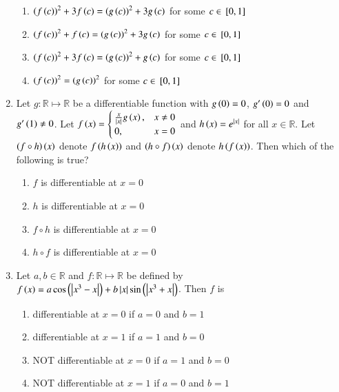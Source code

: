\documentclass[journal]{IEEEtran}
\numberwithin{equation}{enumi}
\numberwithin{figure}{enumi}
\begin{document}
\begin{enumerate}
    \hfill{}
    
    \begin{enumerate}
        \item ${\left(f\left(c\right)\right)}^2+3f\left(c\right)={\left(g\left(c\right)\right)}^2+3g\left(c\right)$ for some $c\in {}\left[0,1\right]$
        \item ${\left(f\left(c\right)\right)}^2+f\left(c\right)={\left(g\left(c\right)\right)}^2+3g\left(c\right)$ for some $c\in {}\left[0,1\right]$
        \item ${\left(f\left(c\right)\right)}^2+3f\left(c\right)={\left(g\left(c\right)\right)}^2+g\left(c\right)$ for some $c\in {}\left[0,1\right]$
        \item ${\left(f\left(c\right)\right)}^2={\left(g\left(c\right)\right)}^2$ for some $c\in {}\left[0,1\right]$ 
    \end{enumerate}


    \item 
	    Let $g: \mathbb{R}\mapsto \mathbb{R}$ be a differentiable function with $g\left(0\right)=0$, $g^{\prime}\left(0\right)=0$ and $g^{\prime}\left(1\right)\neq 0$. Let $f\left(x\right)=
        \begin{cases}
		\frac{x}{\left\vert x\right\vert}g\left(x\right), & x\neq 0 \\
            0, & x=0
        \end{cases}$ 
	and $h\left(x\right)=e^{\left\vert x\right\vert}$ for all $x\in \mathbb{R}$. Let $\left(f\circ h\right)\left(x\right)$ denote $f\left(h\left(x\right)\right)$ and $\left(h\circ f\right)\left(x\right)$ denote $h\left(f\left(x\right)\right)$. Then which of the following is true? 

    \hfill{}
    
    \begin{enumerate}        
        \item $f$ is differentiable at $x=0$ 
        \item $h$ is differentiable at $x=0$ 
        \item $f\circ h$ is differentiable at $x=0$ 
        \item $h\circ f$ is differentiable at $x=0$  
    \end{enumerate}


    \item 
	    Let $a, b\in \mathbb{R}$ and $f: \mathbb{R}\mapsto \mathbb{R}$ be defined by $f\left(x\right)=a\cos \left(\left\vert x^3-x\right\vert\right) +b\left\vert x\right\vert\sin \left(\left\vert x^3+x\right\vert\right)$. Then $f$ is 
   
    \hfill{}
    
    \begin{enumerate}
        \item differentiable at $x=0$ if $a=0$ and $b=1$
        \item differentiable at $x=1$ if $a=1$ and $b=0$
        \item {NOT} differentiable at $x=0$ if $a=1$ and $b=0$
        \item {NOT} differentiable at $x=1$ if $a=0$ and $b=1$
    \end{enumerate}



\end{enumerate}
\end{document}
